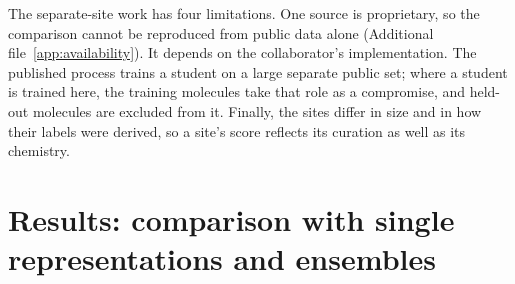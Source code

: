 The separate-site work has four limitations. One source is proprietary, so the comparison cannot be reproduced from public data alone (Additional file~\ref{app:availability}). It depends on the collaborator's implementation. The published process trains a student on a large separate public set; where a student is trained here, the training molecules take that role as a compromise, and held-out molecules are excluded from it. Finally, the sites differ in size and in how their labels were derived, so a site's score reflects its curation as well as its chemistry.



\section{Results: comparison with single representations and ensembles}
